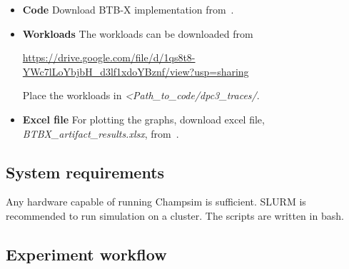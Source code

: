 \begin{itemize}
\item \textbf{Code} Download BTB-X implementation from~\cite{btbx-artifacts}.

\item \textbf{Workloads} The workloads can be downloaded from

\url{https://drive.google.com/file/d/1qs8t8-YWc7lLoYbjbH\_d3lf1xdoYBznf/view?usp=sharing}

Place the workloads in \emph{\textless Path\_to\_code/dpc3\_traces/}.

\item \textbf{Excel file} For plotting the graphs, download excel file, \emph{BTBX\_artifact\_results.xlsx}, from~\cite{btbx-artifacts}.

\end{itemize}

\subsection{System requirements}
Any hardware capable of running Champsim is sufficient. SLURM is recommended to run simulation on a cluster. The scripts are written in bash.

\subsection{Experiment workflow}

